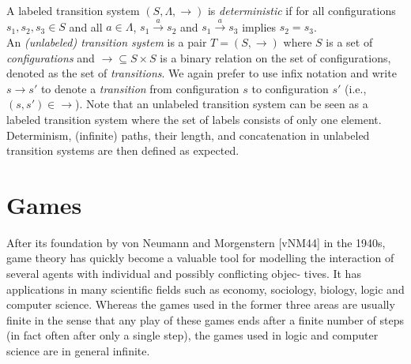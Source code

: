 A labeled transition system $(S, \Lambda, \rightarrow)$ is {\em deterministic} if for all configurations $s_1, s_2, s_3 \in S$ and all
$a \in \Lambda$,
 $ s_1  \xrightarrow{a} s_{2}$ and  
 $s_1  \xrightarrow{a} s_{3} $ implies $s_2 = s_3 $. \\



An {\em (unlabeled) transition system} is a pair $T = (S,\rightarrow )$ where $S$ is a set of 
{\em configurations} and  
$ {\rightarrow} \subseteq S \times S$ is a
binary relation 
on
the set of configurations, denoted as the set of {\em transitions}. 
We again prefer to use infix notation and write $s \rightarrow s'$ to denote a {\em transition} from configuration $s$ to configuration $s'$ (i.e., $ (s,s') \in  {\rightarrow} $). \newline
Note 
 that an unlabeled transition system can be seen as a labeled transition system where the set of labels consists of only one element. 
Determinism, (infinite) paths, their length, and concatenation in unlabeled transition systems are
then defined as expected.

\section{Games}


\iffalse
After its foundation by von Neumann and Morgenstern [vNM44] in the
1940s, game theory has quickly become a valuable tool for modelling the
interaction of several agents with individual and possibly conflicting objec-
tives. It has applications in many scientific fields such as economy, sociology,
biology, logic and computer science. Whereas the games used in the former
three areas are usually finite in the sense that any play of these games ends
after a finite number of steps (in fact often after only a single step), the
games used in logic and computer science are in general infinite.

